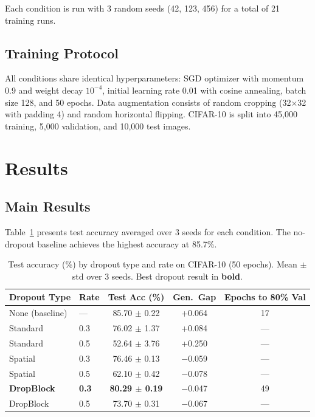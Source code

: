 \documentclass[11pt]{article}
\begin{document}
Each condition is run with 3 random seeds (42, 123, 456) for a total of 21 training runs.

\subsection{Training Protocol}

All conditions share identical hyperparameters: SGD optimizer with momentum 0.9 and weight decay $10^{-4}$, initial learning rate 0.01 with cosine annealing, batch size 128, and 50 epochs. Data augmentation consists of random cropping (32$\times$32 with padding 4) and random horizontal flipping. CIFAR-10 is split into 45,000 training, 5,000 validation, and 10,000 test images.

\section{Results}

\subsection{Main Results}

Table~\ref{tab:main-results} presents test accuracy averaged over 3 seeds for each condition. The no-dropout baseline achieves the highest accuracy at 85.7\%.

\begin{table}[t]
\centering
\caption{Test accuracy (\%) by dropout type and rate on CIFAR-10 (50 epochs). Mean $\pm$ std over 3 seeds. Best dropout result in \textbf{bold}.}
\label{tab:main-results}
\begin{tabular}{llccc}
\toprule
Dropout Type & Rate & Test Acc (\%) & Gen.\ Gap & Epochs to 80\% Val \\
\midrule
None (baseline) & --- & 85.70 $\pm$ 0.22 & +0.064 & 17 \\
\midrule
Standard & 0.3 & 76.02 $\pm$ 1.37 & +0.084 & --- \\
Standard & 0.5 & 52.64 $\pm$ 3.76 & +0.250 & --- \\
\midrule
Spatial & 0.3 & 76.46 $\pm$ 0.13 & $-$0.059 & --- \\
Spatial & 0.5 & 62.10 $\pm$ 0.42 & $-$0.078 & --- \\
\midrule
\textbf{DropBlock} & \textbf{0.3} & \textbf{80.29 $\pm$ 0.19} & $-$0.047 & 49 \\
DropBlock & 0.5 & 73.70 $\pm$ 0.31 & $-$0.067 & --- \\
\bottomrule
\end{tabular}
\end{table}
\end{document}
